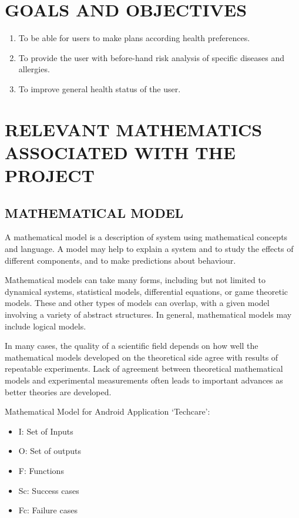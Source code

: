 \documentclass[12pt,a4paper]{report}
\begin{document}
\section{GOALS AND OBJECTIVES}
\begin{enumerate}
	\item To be able for users to make plans according health preferences.
	\item To provide the user with before-hand risk analysis of specific diseases and allergies.
	\item To improve general health status of the user.
	
\end{enumerate}

\section{RELEVANT MATHEMATICS ASSOCIATED WITH THE PROJECT}
\subsection{MATHEMATICAL MODEL}
	A mathematical model is a description of system using mathematical concepts and language.  A model may help to explain a system and to study the effects of different components, and to make predictions about behaviour.
	
	Mathematical models can take many forms, including but not limited to dynamical systems, statistical models, differential equations, or game theoretic models. These and other types of models can overlap, with a given model involving a variety of abstract structures. In general, mathematical models may include logical models.
	
	In many cases, the quality of a scientific field depends on how well the mathematical models developed on the theoretical side agree with results of repeatable experiments. Lack of agreement between theoretical mathematical models and experimental measurements often leads to important advances as better theories are developed.
	
	Mathematical Model for Android Application `Techcare':
	\begin{itemize}
		\item I: Set of Inputs
        \item O: Set of outputs
		\item F: Functions
		\item Sc: Success cases
		\item Fc: Failure cases\\
	\end{itemize}
	
\end{document}

